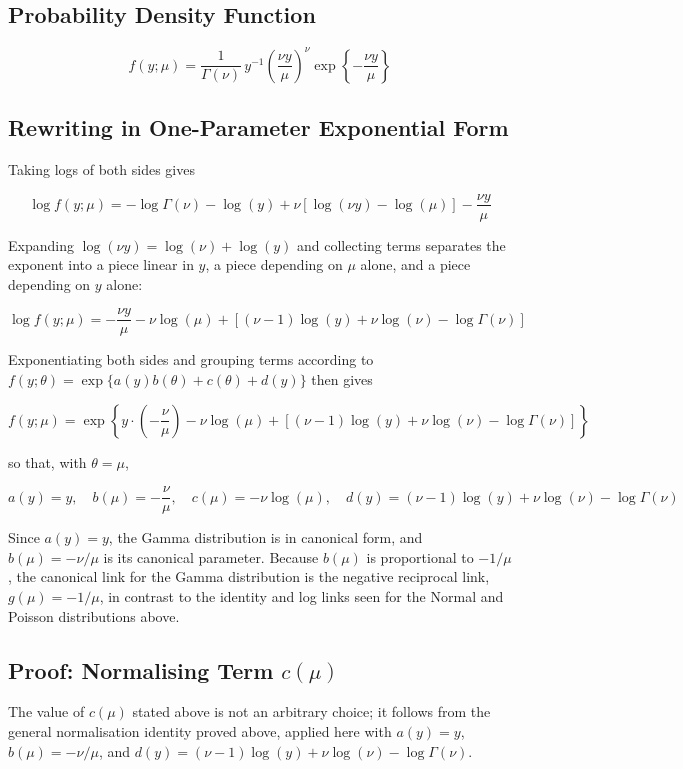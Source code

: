 \subsection*{Probability Density Function}
\begin{mathbox}
\[
f(y;\mu) = \frac{1}{\Gamma(\nu)}\,y^{-1}\left(\frac{\nu y}{\mu}\right)^\nu\exp\left\{-\frac{\nu y}{\mu}\right\}
\]
\end{mathbox}

\subsection*{Rewriting in One-Parameter Exponential Form}
Taking logs of both sides gives
\begin{mathbox}
\[
\log f(y;\mu) = -\log\Gamma(\nu) - \log(y) + \nu\left[\log(\nu y) - \log(\mu)\right] - \frac{\nu y}{\mu}
\]
\end{mathbox}
Expanding $\log(\nu y)=\log(\nu)+\log(y)$ and collecting terms separates the exponent into a piece linear in $y$, a piece depending on $\mu$ alone, and a piece depending on $y$ alone:
\begin{mathbox}
\[
\log f(y;\mu) = -\frac{\nu y}{\mu} - \nu\log(\mu) + \left[(\nu-1)\log(y) + \nu\log(\nu) - \log\Gamma(\nu)\right]
\]
\end{mathbox}
Exponentiating both sides and grouping terms according to $f(y;\theta) = \exp\{a(y)b(\theta)+c(\theta)+d(y)\}$ then gives
\begin{mathbox}
\[
f(y;\mu) = \exp\left\{y\cdot\left(-\frac{\nu}{\mu}\right) - \nu\log(\mu) + \left[(\nu-1)\log(y) + \nu\log(\nu) - \log\Gamma(\nu)\right]\right\}
\]
\end{mathbox}
so that, with $\theta=\mu$,
\begin{mathbox}
\[
a(y)=y,\quad b(\mu) = -\frac{\nu}{\mu},\quad c(\mu) = -\nu\log(\mu),\quad d(y) = (\nu-1)\log(y)+\nu\log(\nu)-\log\Gamma(\nu)
\]
\end{mathbox}
Since $a(y)=y$, the Gamma distribution is in canonical form, and $b(\mu)=-\nu/\mu$ is its canonical parameter. Because $b(\mu)$ is proportional to $-1/\mu$, the canonical link for the Gamma distribution is the negative reciprocal link, $g(\mu)=-1/\mu$, in contrast to the identity and log links seen for the Normal and Poisson distributions above.

\subsection*{Proof: Normalising Term $c(\mu)$}
The value of $c(\mu)$ stated above is not an arbitrary choice; it follows from the general normalisation identity proved above, applied here with $a(y)=y$, $b(\mu)=-\nu/\mu$, and $d(y)=(\nu-1)\log(y)+\nu\log(\nu)-\log\Gamma(\nu)$.


